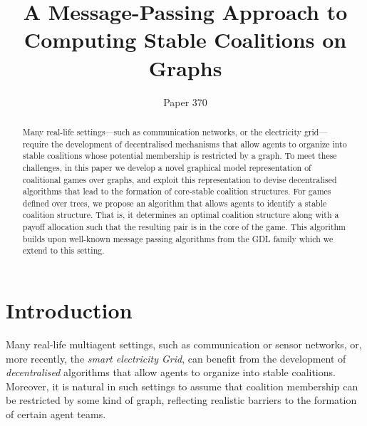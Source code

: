\documentclass{aamas2012}
\author{
\alignauthor Paper  370
}
\title{A Message-Passing Approach to Computing Stable Coalitions on Graphs}
\begin{document}
\maketitle
\begin{abstract}
\begin{small}
Many real-life settings---such as communication networks, or
the electricity grid---require the development of decentralised mechanisms that
allow agents to organize into stable coalitions whose potential membership is
restricted by a graph. To meet these challenges, in this paper we develop a
novel graphical model representation of coalitional games over
graphs, and exploit this representation to devise decentralised algorithms
that lead to the formation of core-stable coalition structures. For games defined
over trees, we propose an algorithm that allows agents to identify a stable
coalition structure. That is, it determines an optimal coalition structure along with a payoff
allocation such that the resulting pair is in the core of the game. 
This algorithm builds upon
well-known message passing algorithms from the GDL family
\cite{actiongdl,ecs21664} which we extend to this setting.
\end{small}
\end{abstract}








\section{Introduction}
\noindent Many real-life multiagent settings, such as communication or sensor networks, or, more recently, the {\em smart electricity Grid}, can benefit
from the development of \emph{decentralised}
algorithms that allow agents to organize into stable coalitions. Moreover, it is natural in such settings to assume
that coalition membership can be restricted by some kind of graph, reflecting realistic barriers to the formation
of certain agent teams.
 
\end{document}
